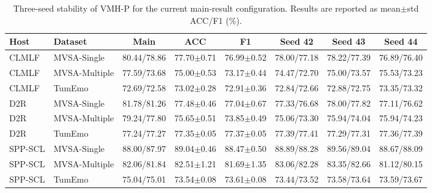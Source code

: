 \begin{table}[t]
\centering
\caption{Three-seed stability of VMH-P for the current main-result configuration. Results are reported as mean$\pm$std ACC/F1 (\%).}
\label{tab:vmhp_main_three_seed}
\footnotesize
\setlength{\tabcolsep}{3.6pt}
\begin{tabular}{llcccccc}
\toprule
\textbf{Host} & \textbf{Dataset} & \textbf{Main} & \textbf{ACC} & \textbf{F1} & \textbf{Seed 42} & \textbf{Seed 43} & \textbf{Seed 44} \\
\midrule
CLMLF & MVSA-Single & 80.44/78.86 & 77.70$\pm$0.71 & 76.99$\pm$0.52 & 78.00/77.18 & 78.22/77.39 & 76.89/76.40 \\
CLMLF & MVSA-Multiple & 77.59/73.68 & 75.00$\pm$0.53 & 73.17$\pm$0.44 & 74.47/72.70 & 75.00/73.57 & 75.53/73.23 \\
CLMLF & TumEmo & 72.69/72.58 & 73.02$\pm$0.28 & 72.91$\pm$0.36 & 72.84/72.66 & 72.88/72.75 & 73.35/73.32 \\
D2R & MVSA-Single & 81.78/81.26 & 77.48$\pm$0.46 & 77.04$\pm$0.67 & 77.33/76.68 & 78.00/77.82 & 77.11/76.62 \\
D2R & MVSA-Multiple & 79.24/77.80 & 75.65$\pm$0.51 & 73.85$\pm$0.49 & 75.06/73.30 & 75.94/74.04 & 75.94/74.23 \\
D2R & TumEmo & 77.24/77.27 & 77.35$\pm$0.05 & 77.37$\pm$0.05 & 77.39/77.41 & 77.29/77.31 & 77.36/77.39 \\
SPP-SCL & MVSA-Single & 88.00/87.97 & 89.04$\pm$0.46 & 88.47$\pm$0.50 & 88.89/88.28 & 89.56/89.04 & 88.67/88.09 \\
SPP-SCL & MVSA-Multiple & 82.06/81.84 & 82.51$\pm$1.21 & 81.69$\pm$1.35 & 83.06/82.28 & 83.35/82.66 & 81.12/80.15 \\
SPP-SCL & TumEmo & 75.04/75.01 & 73.54$\pm$0.08 & 73.61$\pm$0.08 & 73.44/73.52 & 73.58/73.64 & 73.59/73.67 \\
\bottomrule
\end{tabular}
\end{table}
